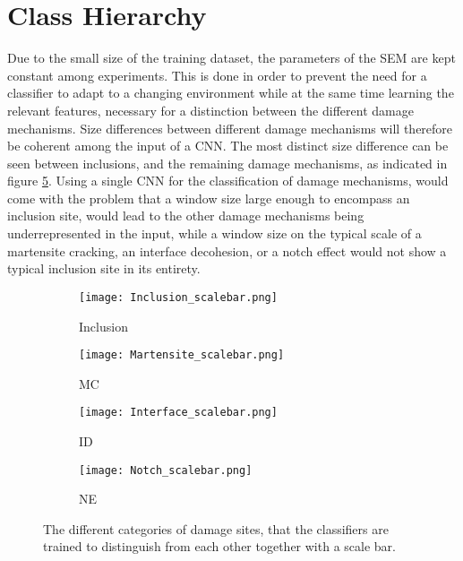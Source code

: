 \section{Class Hierarchy}

Due to the small size of the training dataset, the parameters of the SEM are kept constant among experiments. This is done in order to prevent the need for a classifier to adapt to a changing environment while at the same time learning the relevant features, necessary for a distinction between the different damage mechanisms. Size differences between different damage mechanisms will therefore be coherent among the input of a CNN. The most distinct size difference can be seen between inclusions, and the remaining damage mechanisms, as indicated in figure \ref{fig:SizeDifference}. Using a single CNN for the classification of damage mechanisms, would come with the problem that a window size large enough to encompass an inclusion site, would lead to the other damage mechanisms being underrepresented in the input, while a window size on the typical scale of a martensite cracking, an interface decohesion, or a notch effect would not show a typical inclusion site in its entirety. \\

\begin{figure}[H]
\centering
\begin{subfigure}{.25\textwidth}
\centering
  \texttt{[image: Inclusion\_scalebar.png]}
  \caption{Inclusion}
  \label{fig:Inclusion_scalebar}
\end{subfigure}%
\begin{subfigure}{.25\textwidth}
\centering
  \texttt{[image: Martensite\_scalebar.png]}
  \caption{MC}
  \label{fig:Martensite_scalebar}
\end{subfigure}%
\begin{subfigure}{.25\textwidth}
\centering
  \texttt{[image: Interface\_scalebar.png]}
  \caption{ID}
  \label{fig:Interface_scalebar}
\end{subfigure}%
\begin{subfigure}{.25\textwidth}
\centering
  \texttt{[image: Notch\_scalebar.png]}
  \caption{NE}
  \label{fig:Notch_scalebar}
\end{subfigure}%
\caption{The different categories of damage sites, that the classifiers are trained to distinguish from each other together with a scale bar.}
\label{fig:SizeDifference}
\end{figure}

